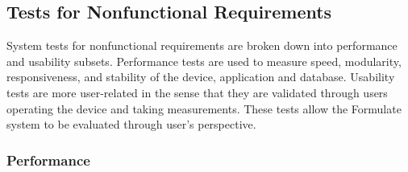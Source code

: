 \documentclass[12pt, titlepage]{article}
\begin{document}
\subsection{Tests for Nonfunctional Requirements}
System tests for nonfunctional requirements are broken down into performance and usability subsets. Performance tests are used to measure speed, modularity, responsiveness, and stability of
the device, application and database. Usability tests are more user-related in the sense that they are validated through users operating the device and taking measurements. These tests allow the Formulate system to be evaluated 
through user's perspective.



\subsubsection{Performance}
		
\end{document}
